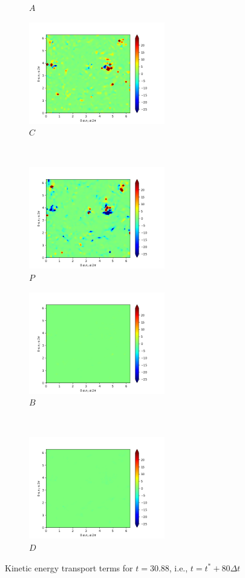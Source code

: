 \begin{figure}[H]
\begin{subfigure}{0.45\textwidth}
        \caption{$A$}
    \end{subfigure}
    \newline
    \begin{subfigure}{0.45\textwidth}
        \includegraphics[height=1.75in]{media/run-cds-65/C-ke-1420.png}
        \caption{$C$}
    \end{subfigure}
    ~
    \begin{subfigure}{0.45\textwidth}
        \includegraphics[height=1.75in]{media/run-cds-65/P-ke-1420.png}
        \caption{$P$}
    \end{subfigure}
    \newline
    \begin{subfigure}{0.45\textwidth}
        \includegraphics[height=1.75in]{media/run-cds-65/B-ke-1420.png}
        \caption{$B$}
    \end{subfigure}
    ~
    \begin{subfigure}{0.45\textwidth}
        \includegraphics[height=1.75in]{media/run-cds-65/D-ke-1420.png}
        \caption{$D$}
    \end{subfigure}
    \caption{Kinetic energy transport terms for $t=30.88$, i.e., $t=t^{\ast} + 80 \Delta t$}
\end{figure}

